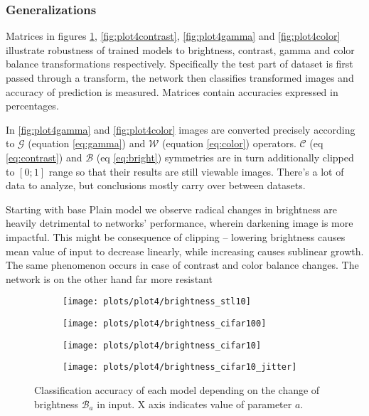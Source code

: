     \clearpage
    \subsubsection*{Generalizations}
    Matrices in figures \ref{fig:plot4brightness}, \ref{fig:plot4contrast},
    \ref{fig:plot4gamma} and \ref{fig:plot4color} illustrate robustness of trained
    models to brightness, contrast, gamma and color balance transformations
    respectively. Specifically the test part of dataset is first passed through
    a transform, the network then classifies transformed images and accuracy of
    prediction is measured. Matrices contain accuracies expressed in percentages.

    In \ref{fig:plot4gamma} and \ref{fig:plot4color} images are converted
    precisely according to $\mathcal{G}$ (equation \ref{eq:gamma})
    and $\mathcal{W}$ (equation \ref{eq:color}) operators. $\mathcal{C}$
    (eq \ref{eq:contrast})
    and $\mathcal{B}$ (eq \ref{eq:bright}) symmetries are in turn additionally
    clipped to $[0;1]$ range so that their results are still viewable images.
    There's a lot of data to analyze, but conclusions mostly carry over between
    datasets.

    Starting with base Plain model we observe radical changes in brightness
    are heavily detrimental to networks' performance, wherein darkening image
    is more impactful. This might be consequence of clipping -- lowering
    brightness causes mean value of input to decrease linearly, while increasing
    causes sublinear growth. The same phenomenon occurs in case of contrast and
    color balance changes. The network is on the other hand far more resistant
    \begin{figure}[h!]
    \begin{adjustwidth}{-11em}{-11em}
        \centering
        \begin{subfigure}{0.6\textwidth}
            \texttt{[image: plots/plot4/brightness\_stl10]}
        \end{subfigure}
        \begin{subfigure}{0.6\textwidth}
            \texttt{[image: plots/plot4/brightness\_cifar100]}
        \end{subfigure}
        \begin{subfigure}{0.6\textwidth}
            \texttt{[image: plots/plot4/brightness\_cifar10]}
        \end{subfigure}
        \begin{subfigure}{0.6\textwidth}
            \texttt{[image: plots/plot4/brightness\_cifar10\_jitter]}
        \end{subfigure}
    \end{adjustwidth}
        \caption{Classification accuracy of each model depending on the change
        of brightness $\mathcal{B}_a$ in input. X axis indicates value of
        parameter $a$.}
        \label{fig:plot4brightness}
    \end{figure}


